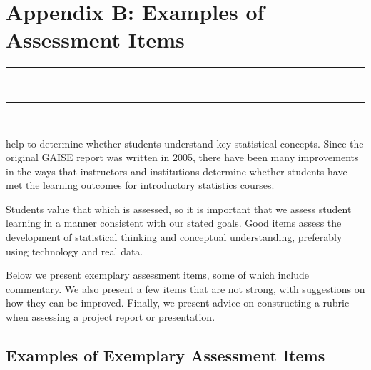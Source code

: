 \chapter{Appendix B: Examples of Assessment Items}


\vspace{-.53in}


\noindent\color{graylight}\rule[0cm]{3.25in}{0.03cm} \\


\noindent\color{graylight}\rule[0.4cm]{3.25in}{0.03cm} \\


\color{black}



 help to determine whether students understand key statistical concepts. Since the original GAISE report was written in 2005, there have been many improvements in the ways that instructors and institutions determine whether students have met the learning outcomes for introductory statistics courses. 





Students value that which is assessed, 
%
so it is important that we assess student learning in a manner consistent with our stated goals. Good items assess the development of statistical thinking and conceptual understanding, preferably using technology and real data.





Below we present exemplary assessment items, some of which include commentary. We also present a few items that are not strong, with suggestions on how they can be improved. Finally, we present advice on constructing a rubric when assessing a project report or presentation.








\section{\textbf{Examples of Exemplary Assessment Items}}


